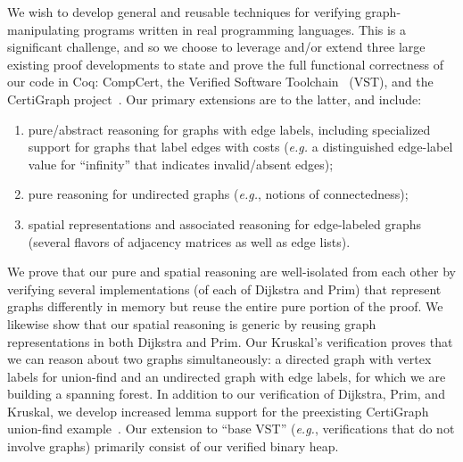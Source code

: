 We wish to develop general and reusable techniques for verifying graph-manipulating programs written in real programming languages.  This is a significant challenge, and so we choose to leverage and/or extend three large existing proof developments to state and prove the full functional correctness of our code in Coq: CompCert, the Verified Software Toolchain~\cite{appel:programlogics} (VST), and the CertiGraph project~\cite{DBLP:journals/pacmpl/WangCMH19}.  Our primary extensions are to the latter, and include:
\begin{enumerate}
\item pure/abstract reasoning for graphs with edge labels, including specialized support for graphs that label edges with costs (\emph{e.g.} a distinguished edge-label value for ``infinity'' that indicates invalid/absent edges);
\item pure reasoning for undirected graphs (\emph{e.g.}, notions of connectedness);
\item spatial representations and associated reasoning for edge-labeled graphs (several flavors of adjacency matrices as well as edge lists).
\end{enumerate}
We prove that our pure and spatial reasoning are well-isolated from each other by verifying several implementations (of each of Dijkstra and Prim) that represent graphs differently in memory but reuse the entire pure portion of the proof.  We likewise show that our spatial reasoning is generic by reusing graph representations in both Dijkstra and Prim.  Our Kruskal's verification proves that we can reason about two graphs simultaneously: a directed graph with vertex labels for union-find and an undirected graph with edge labels, for which we are building a spanning forest.
In addition to our verification of Dijkstra, Prim, and Kruskal, we develop increased lemma support for the preexisting CertiGraph union-find example~\cite{DBLP:journals/pacmpl/WangCMH19}.  Our extension to ``base VST'' (\emph{e.g.}, verifications that do not involve graphs) primarily consist of our verified binary heap.



